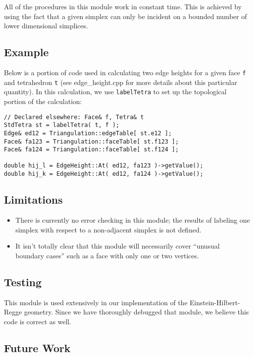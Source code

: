 \documentclass[10pt]{article}%
\begin{document}
All of the procedures in this module work in constant time. This is achieved by using the fact that a given simplex can only be incident on a bounded number of lower dimensional simplices.

\subsection*{Example}

Below is a portion of code used in calculating two edge heights for a given face \texttt{f} and tetrahedron \texttt{t} (see edge\_height.cpp for more details about this particular quantity). In this calculation, we use \texttt{labelTetra} to set up the topological portion of the calculation:

{\small{\begin{verbatim} 
// Declared elsewhere: Face& f, Tetra& t
StdTetra st = labelTetra( t, f );
Edge& ed12 = Triangulation::edgeTable[ st.e12 ];
Face& fa123 = Triangulation::faceTable[ st.f123 ];
Face& fa124 = Triangulation::faceTable[ st.f124 ];

double hij_l = EdgeHeight::At( ed12, fa123 )->getValue();
double hij_k = EdgeHeight::At( ed12, fa124 )->getValue();
\end{verbatim}
}}

\subsection*{Limitations}

\begin{itemize}\item  There is currently no error checking in this module; the results of labeling one simplex with respect to a non-adjacent simplex is not defined.
\item  It isn't totally clear that this module will necessarily cover ``unusual boundary cases'' such as a face with only one or two vertices. 
\end{itemize}

\subsection*{Testing}

This module is used extensively in our implementation of the Einstein-Hilbert-Regge geometry. Since we have thoroughly debugged that module, we believe this code is correct as well.

\subsection*{Future Work}
\end{document}
